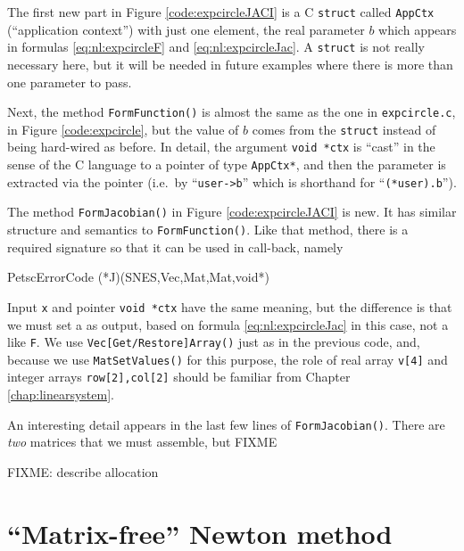
The first new part in Figure \ref{code:expcircleJACI} is a C \texttt{struct} called \texttt{AppCtx} (``application context'') with just one element, the real parameter $b$ which appears in formulas \eqref{eq:nl:expcircleF} and \eqref{eq:nl:expcircleJac}.  A \texttt{struct} is not really necessary here, but it will be needed in future examples where there is more than one parameter to pass.

Next, the method \texttt{FormFunction()} is almost the same as the one in \texttt{expcircle.c}, in Figure \ref{code:expcircle}, but the value of $b$ comes from the \texttt{struct} instead of being hard-wired as before.  In detail, the argument \texttt{void *ctx} is ``cast'' in the sense of the C language \citep{KernighanRitchie1988} to a pointer of type \texttt{AppCtx*}, and then the parameter is extracted via the pointer (i.e.~by ``\texttt{user->b}'' which is shorthand for ``\texttt{(*user).b}'').

The method \texttt{FormJacobian()} in Figure \ref{code:expcircleJACI} is new.  It has similar structure and semantics to \texttt{FormFunction()}.  Like that method, there is a required signature so that it can be used in call-back, namely
\begin{code}
PetscErrorCode (*J)(SNES,Vec,Mat,Mat,void*)
\end{code}
Input \pVec \texttt{x} and pointer \texttt{void *ctx} have the same meaning, but the difference is that we must set a \pMat as output, based on formula \eqref{eq:nl:expcircleJac} in this case, not a \pVec like \texttt{F}.  We use \texttt{Vec[Get/Restore]Array()} just as in the previous code, and, because we use \texttt{MatSetValues()} for this purpose, the role of real array \texttt{v[4]} and integer arrays \texttt{row[2],col[2]} should be familiar from Chapter \ref{chap:linearsystem}.

An interesting detail appears in the last few lines of \texttt{FormJacobian()}.  There are \emph{two} matrices that we must assemble, but FIXME

FIXME: describe \pMat allocation


\section{``Matrix-free'' Newton method}

